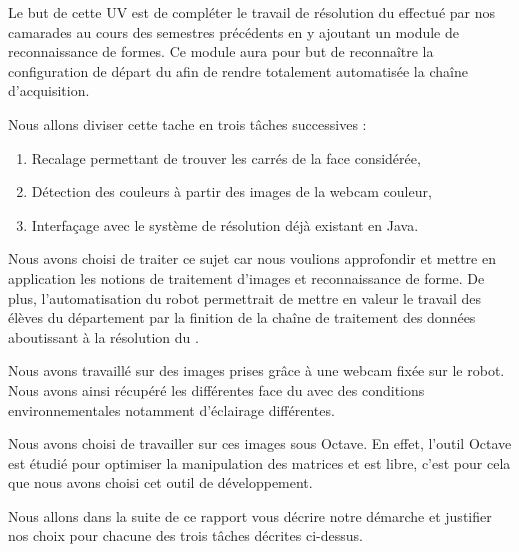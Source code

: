   Le but de cette UV est de compléter le travail de résolution du \rubic{} effectué par nos camarades au cours des semestres précédents en 
y ajoutant un module de reconnaissance de formes. 
  Ce module aura pour but de reconnaître la configuration de départ du \rubic{} afin de rendre totalement automatisée la chaîne d'acquisition. 

  Nous allons diviser cette tache en trois tâches successives : 
\begin{enumerate}
  \item Recalage permettant de trouver les carrés de la face considérée,  
  \item Détection des couleurs à partir des images de la webcam couleur, 
  \item Interfaçage avec le système de résolution déjà existant en Java. 
\end{enumerate}

  Nous avons choisi de traiter ce sujet car nous voulions approfondir et mettre en application les notions de traitement d'images 
et reconnaissance de forme. 
  De plus, l'automatisation du robot permettrait de mettre en valeur le travail des élèves du département 
\asi{} par la finition de la chaîne de traitement des données aboutissant à la résolution du \rubic{}. 

  Nous avons travaillé sur des images prises grâce à une webcam fixée sur le robot. 
Nous avons ainsi récupéré les différentes face du \rubic{} avec des conditions environnementales notamment d'éclairage différentes. 

  Nous avons choisi de travailler sur ces images sous Octave. 
En effet, l'outil Octave est étudié pour optimiser la manipulation des matrices et est libre, 
c'est pour cela que nous avons choisi cet outil de développement. 

  Nous allons dans la suite de ce rapport vous décrire notre démarche et justifier nos choix pour chacune des trois tâches 
décrites ci-dessus. 
